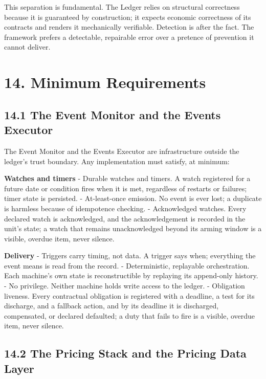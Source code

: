 \documentclass[11pt,a4paper]{article}
\begin{document}
This separation is fundamental. The Ledger relies on structural
correctness because it is guaranteed by construction; it expects
economic correctness of its contracts and renders it mechanically
verifiable. Detection is after the fact. The framework prefers a
detectable, repairable error over a pretence of prevention it cannot
deliver.

\hypertarget{minimum-requirements}{%
\section{14. Minimum Requirements}\label{minimum-requirements}}

\hypertarget{the-event-monitor-and-the-events-executor}{%
\subsection{14.1 The Event Monitor and the Events
Executor}\label{the-event-monitor-and-the-events-executor}}

The Event Monitor and the Events Executor are infrastructure outside the
ledger's trust boundary. Any implementation must satisfy, at minimum:

\textbf{Watches and timers} - Durable watches and timers. A watch
registered for a future date or condition fires when it is met,
regardless of restarts or failures; timer state is persisted. -
At-least-once emission. No event is ever lost; a duplicate is harmless
because of idempotence checking. - Acknowledged watches. Every declared
watch is acknowledged, and the acknowledgement is recorded in the unit's
state; a watch that remains unacknowledged beyond its arming window is a
visible, overdue item, never silence.

\textbf{Delivery} - Triggers carry timing, not data. A trigger says
when; everything the event means is read from the record. -
Deterministic, replayable orchestration. Each machine's own state is
reconstructible by replaying its append-only history. - No privilege.
Neither machine holds write access to the ledger. - Obligation liveness.
Every contractual obligation is registered with a deadline, a test for
its discharge, and a fallback action, and by its deadline it is
discharged, compensated, or declared defaulted; a duty that fails to
fire is a visible, overdue item, never silence.

\hypertarget{the-pricing-stack-and-the-pricing-data-layer}{%
\subsection{14.2 The Pricing Stack and the Pricing Data
Layer}\label{the-pricing-stack-and-the-pricing-data-layer}}
\end{document}
